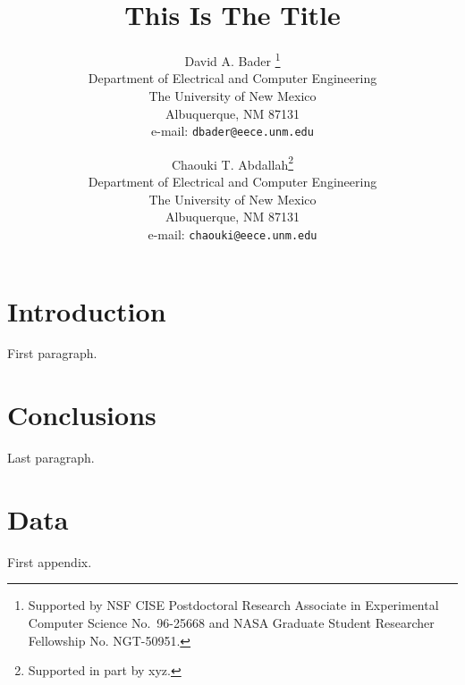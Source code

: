 \documentclass[final]{eeceTR}
\title{This Is The Title}
\author{David A. Bader \thanks{Supported by  NSF CISE Postdoctoral Research Associate in Experimental Computer
Science No.~96-25668 and NASA Graduate Student Researcher Fellowship
No. NGT-50951.}\\
Department of Electrical and Computer Engineering\\
The University of New Mexico\\
Albuquerque, NM 87131\\
e-mail: {\tt dbader@eece.unm.edu}
\and
Chaouki T. Abdallah\thanks{Supported in part by xyz.}\\
Department of Electrical and Computer Engineering\\
The University of New Mexico\\
Albuquerque, NM 87131\\
e-mail: {\tt chaouki@eece.unm.edu}
}
\begin{document}
\maketitle
\makeabstract

\section{Introduction}

First paragraph. \cite{JAJA92}

\section{Conclusions}

Last paragraph.

\appendix

\section{Data}
First appendix.



\end{document}
